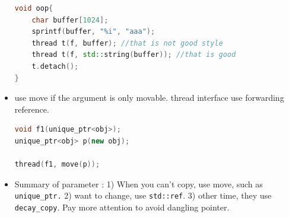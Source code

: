\documentclass[a4paper,11pt,twoside]{book}
\begin{document}
\begin{itemize}
\begin{lstlisting}[frame=single, language=c++]
void oop{
	char buffer[1024];
	sprintf(buffer, "%i", "aaa");
	thread t(f, buffer); //that is not good style
	thread t(f, std::string(buffer)); //that is good
    t.detach();
}
\end{lstlisting}	

    \item use move if the argument is only movable. thread interface use forwarding reference. 
\begin{lstlisting}[frame=single, language=c++]
void f1(unique_ptr<obj>);
unique_ptr<obj> p(new obj);

thread(f1, move(p));
\end{lstlisting}

    \item Summary of parameter :
	1) When you can't copy, use move, such as \texttt{unique\_ptr.}
	2) want to change, use \texttt{std::ref}.
	3) other time, they use \texttt{decay\_copy}. Pay more attention to avoid dangling pointer.  


\end{itemize}
\end{document}
